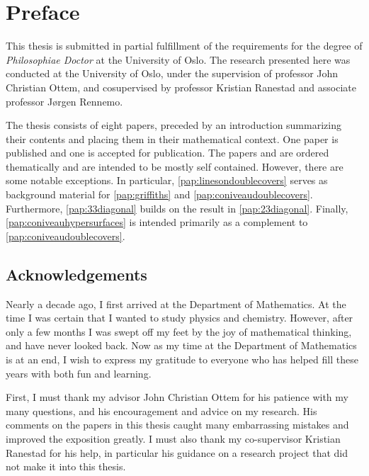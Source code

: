 \chapter{Preface}


This thesis is submitted in partial fulfillment of the requirements
for the degree of \emph{Philosophiae Doctor} at the University of Oslo.
The research presented here was conducted at the University of Oslo,
under the supervision of professor John Christian Ottem, and cosupervised by professor Kristian Ranestad and associate professor Jørgen Rennemo.


The thesis consists of eight papers, preceded by an introduction summarizing their contents and placing them in their mathematical context. One paper is published and one is accepted for publication. The papers and are ordered thematically and are intended to be mostly self contained. However, there are some notable exceptions. In particular, \cref{pap:linesondoublecovers} serves as background material for \cref{pap:griffiths} and \cref{pap:coniveaudoublecovers}. Furthermore, \cref{pap:33diagonal} builds on the result in \cref{pap:23diagonal}. Finally, \cref{pap:coniveauhypersurfaces} is intended primarily as a complement to \cref{pap:coniveaudoublecovers}.


\newpage
\section*{Acknowledgements}
Nearly a decade ago, I first arrived at the Department of Mathematics. At the time I was certain that I wanted to study physics and chemistry. However, after only a few months I was swept off my feet by the joy of mathematical thinking, and have never looked back. Now as my time at the Department of Mathematics is at an end, I wish to express my gratitude to everyone who has helped fill these years with both fun and learning.

First, I must thank my advisor John Christian Ottem for his patience with my many questions, and his encouragement and advice on my research. His comments on the papers in this thesis caught many embarrassing mistakes and improved the exposition greatly. I must also thank my co-supervisor Kristian Ranestad for his help, in particular his guidance on a research project that did not make it into this thesis.

